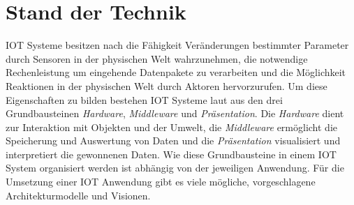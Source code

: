 \documentclass[BMR,Bachelor,ngerman]{twbook}%
\begin{document}


\clearpage

\chapter{Stand der Technik}
\ac{IOT} Systeme besitzen nach  die Fähigkeit Veränderungen bestimmter Parameter durch Sensoren in der physischen Welt wahrzunehmen, die notwendige Rechenleistung um eingehende Datenpakete zu verarbeiten und die Möglichkeit Reaktionen in der physischen Welt durch Aktoren hervorzurufen. Um diese Eigenschaften zu bilden bestehen \ac{IOT} Systeme laut  aus den drei Grundbausteinen \emph{Hardware}, \emph{Middleware}  und  \emph{Präsentation}. Die \emph{Hardware} dient zur Interaktion mit Objekten und der Umwelt, die \emph{Middleware} ermöglicht die Speicherung und Auswertung von Daten und die \emph{Präsentation} visualisiert und interpretiert die gewonnenen Daten. Wie diese Grundbausteine in einem \ac{IOT} System organisiert werden ist abhängig von der jeweiligen Anwendung. Für die Umsetzung einer \ac{IOT} Anwendung gibt es viele mögliche, vorgeschlagene Architekturmodelle und Visionen.
\end{document}
